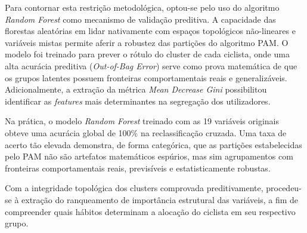 \documentclass[12pt]{article}
\begin{document}
Para contornar esta restrição metodológica, optou-se pelo uso do algoritmo \textit{Random Forest} como mecanismo de validação preditiva. A capacidade das florestas aleatórias em lidar nativamente com espaços topológicos não-lineares e variáveis mistas permite aferir a robustez das partições do algoritmo PAM. O modelo foi treinado para prever o rótulo do cluster de cada ciclista, onde uma alta acurácia preditiva (\textit{Out-of-Bag Error}) serve como prova matemática de que os grupos latentes possuem fronteiras comportamentais reais e generalizáveis. Adicionalmente, a extração da métrica \textit{Mean Decrease Gini} possibilitou identificar as \textit{features} mais determinantes na segregação dos utilizadores.

Na prática, o modelo \textit{Random Forest} treinado com as 19 variáveis originais obteve uma acurácia global de 100\% na reclassificação cruzada. Uma taxa de acerto tão elevada demonstra, de forma categórica, que as partições estabelecidas pelo PAM não são artefatos matemáticos espúrios, mas sim agrupamentos com fronteiras comportamentais reais, previsíveis e estatisticamente robustas.

Com a integridade topológica dos clusters comprovada preditivamente, procedeu-se à extração do ranqueamento de importância estrutural das variáveis, a fim de compreender quais hábitos determinam a alocação do ciclista em seu respectivo grupo.
\end{document}
